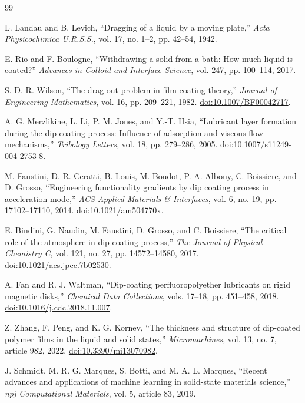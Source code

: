 \documentclass[11pt]{article}
\begin{document}
\begin{thebibliography}{99}

L. Landau and B. Levich,
``Dragging of a liquid by a moving plate,''
\textit{Acta Physicochimica U.R.S.S.}, vol. 17, no. 1--2, pp. 42--54, 1942.

E. Rio and F. Boulogne,
``Withdrawing a solid from a bath: How much liquid is coated?''
\textit{Advances in Colloid and Interface Science}, vol. 247, pp. 100--114, 2017.

S. D. R. Wilson,
``The drag-out problem in film coating theory,''
\textit{Journal of Engineering Mathematics}, vol. 16, pp. 209--221, 1982.
\href{https://doi.org/10.1007/BF00042717}{doi:10.1007/BF00042717}.

A. G. Merzlikine, L. Li, P. M. Jones, and Y.-T. Hsia,
``Lubricant layer formation during the dip-coating process: Influence of adsorption and viscous flow mechanisms,''
\textit{Tribology Letters}, vol. 18, pp. 279--286, 2005.
\href{https://doi.org/10.1007/s11249-004-2753-8}{doi:10.1007/s11249-004-2753-8}.

M. Faustini, D. R. Ceratti, B. Louis, M. Boudot, P.-A. Albouy, C. Boissiere, and D. Grosso,
``Engineering functionality gradients by dip coating process in acceleration mode,''
\textit{ACS Applied Materials \& Interfaces}, vol. 6, no. 19, pp. 17102--17110, 2014.
\href{https://doi.org/10.1021/am504770x}{doi:10.1021/am504770x}.

E. Bindini, G. Naudin, M. Faustini, D. Grosso, and C. Boissiere,
``The critical role of the atmosphere in dip-coating process,''
\textit{The Journal of Physical Chemistry C}, vol. 121, no. 27, pp. 14572--14580, 2017.
\href{https://doi.org/10.1021/acs.jpcc.7b02530}{doi:10.1021/acs.jpcc.7b02530}.

A. Fan and R. J. Waltman,
``Dip-coating perfluoropolyether lubricants on rigid magnetic disks,''
\textit{Chemical Data Collections}, vols. 17--18, pp. 451--458, 2018.
\href{https://doi.org/10.1016/j.cdc.2018.11.007}{doi:10.1016/j.cdc.2018.11.007}.

Z. Zhang, F. Peng, and K. G. Kornev,
``The thickness and structure of dip-coated polymer films in the liquid and solid states,''
\textit{Micromachines}, vol. 13, no. 7, article 982, 2022.
\href{https://doi.org/10.3390/mi13070982}{doi:10.3390/mi13070982}.

J. Schmidt, M. R. G. Marques, S. Botti, and M. A. L. Marques,
``Recent advances and applications of machine learning in solid-state materials science,''
\textit{npj Computational Materials}, vol. 5, article 83, 2019.


\end{thebibliography}
\end{document}
